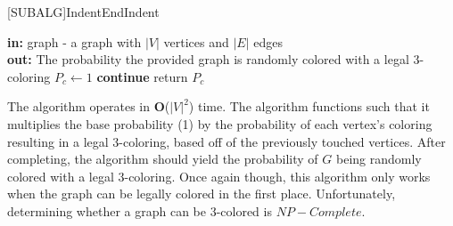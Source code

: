 \documentclass{article}
\begin{document}
\begin{enumerate}
        \pagebreak
        \begin{algorithm}
        	[SUBALG]{Indent}{EndIndent}{}{\algorithmicend\ }%
        	\begin{algorithmic}
        		 \newline
        		\textbf{in: } graph - a graph with $|V|$ vertices and $|E|$ edges \\
        		\textbf{out: } The probability the provided graph is randomly colored with a legal 3-coloring
	        		\State $P_c \gets 1$
			        			\State\textbf{continue}
			        		\Else
			        			\Else
			        			\Indent
			        				\EndIf
			        				\EndIf
			        				\EndIf
			        			\EndIndent
			        			\EndIf
			        		\EndIf
		        		\EndFor
	        		\State return $P_c$
        		\EndProcedure
        	\end{algorithmic}
        \end{algorithm} 
    
    The algorithm operates in \textbf{O}($|V|^2$) time. The algorithm functions such that it multiplies the base probability (1) by the probability of each vertex's coloring resulting in a legal 3-coloring, based off of the previously touched vertices. After completing, the algorithm should yield the probability of $G$ being randomly colored with a legal 3-coloring. Once again though, this algorithm only works when the graph can be legally colored in the first place. Unfortunately, determining whether a graph can be 3-colored is $NP-Complete$. \\
    

\end{enumerate}
\end{document}
